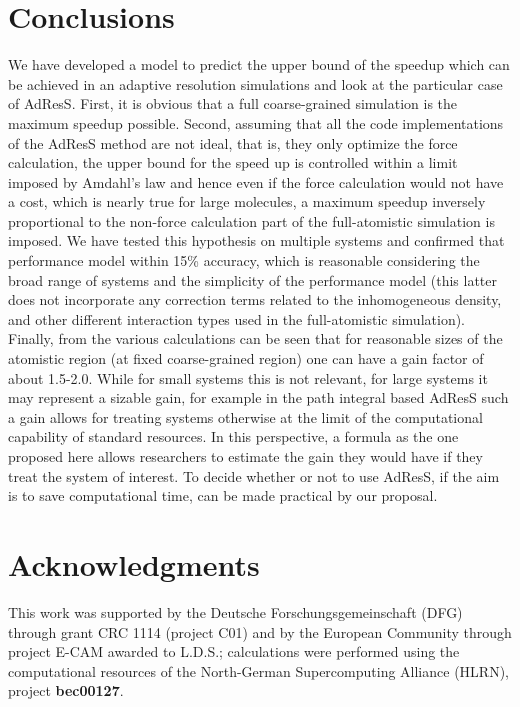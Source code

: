 \documentclass[a4paper,preprint,unsortedaddress]{revtex4-1}
\begin{document}
\section{Conclusions}
We have developed a model to predict the upper bound of the speedup which can be achieved in an adaptive resolution simulations and look at the particular case of AdResS.
First, it is obvious that a full coarse-grained simulation is the maximum speedup possible.
Second, assuming that all the code implementations of the AdResS method are not ideal, that is, they only optimize the force calculation, the upper bound for the speed up is controlled within a limit imposed by Amdahl's law and hence even if the force calculation would not have a cost, which is nearly true for large molecules, a maximum speedup inversely proportional to the non-force calculation part of the full-atomistic simulation is imposed. We have tested this hypothesis on multiple systems and confirmed that performance model within 15\% accuracy, which is reasonable considering the broad range of systems and the simplicity of the performance model (this latter does not incorporate any correction terms related to the inhomogeneous density, and other different interaction types used in the full-atomistic simulation). Finally, from the various calculations can be seen that for reasonable sizes of the atomistic region (at fixed coarse-grained region) one can have a gain factor of about 1.5-2.0. While for small systems this is not relevant, for large systems it may represent a sizable gain, for example in the path integral based AdResS \cite{jcp-anim,cmd} such a gain allows for treating systems otherwise at the limit of the computational capability of standard resources. In this perspective, a formula as the one proposed here allows researchers to estimate the gain they would have if they treat the system of interest. To decide whether or not to use AdResS, if the aim is to save computational time, can be made practical by our proposal.


\section*{Acknowledgments}
 This work was supported by the Deutsche Forschungsgemeinschaft (DFG) through grant CRC 1114 (project C01) and by the European Community through project E-CAM awarded to L.D.S.; calculations were performed using the computational resources of the North-German Supercomputing Alliance (HLRN), project {\bf bec00127}.
\appendix
\end{document}
